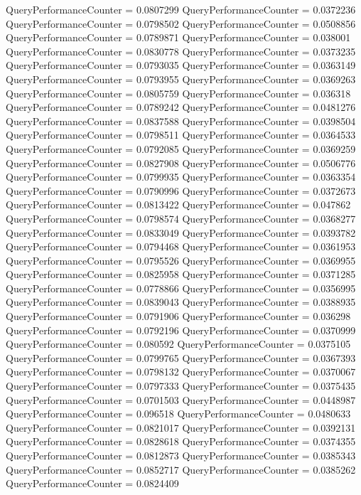 \documentclass[9pt]{article}
\theoremstyle{plain}
\theoremstyle{definition}
\theoremstyle{remark}
\numberwithin{equation}{section}
\begin{document}
QueryPerformanceCounter  =  0.0807299
QueryPerformanceCounter  =  0.0372236
QueryPerformanceCounter  =  0.0798502
QueryPerformanceCounter  =  0.0508856
QueryPerformanceCounter  =  0.0789871
QueryPerformanceCounter  =  0.038001
QueryPerformanceCounter  =  0.0830778
QueryPerformanceCounter  =  0.0373235
QueryPerformanceCounter  =  0.0793035
QueryPerformanceCounter  =  0.0363149
QueryPerformanceCounter  =  0.0793955
QueryPerformanceCounter  =  0.0369263
QueryPerformanceCounter  =  0.0805759
QueryPerformanceCounter  =  0.036318
QueryPerformanceCounter  =  0.0789242
QueryPerformanceCounter  =  0.0481276
QueryPerformanceCounter  =  0.0837588
QueryPerformanceCounter  =  0.0398504
QueryPerformanceCounter  =  0.0798511
QueryPerformanceCounter  =  0.0364533
QueryPerformanceCounter  =  0.0792085
QueryPerformanceCounter  =  0.0369259
QueryPerformanceCounter  =  0.0827908
QueryPerformanceCounter  =  0.0506776
QueryPerformanceCounter  =  0.0799935
QueryPerformanceCounter  =  0.0363354
QueryPerformanceCounter  =  0.0790996
QueryPerformanceCounter  =  0.0372673
QueryPerformanceCounter  =  0.0813422
QueryPerformanceCounter  =  0.047862
QueryPerformanceCounter  =  0.0798574
QueryPerformanceCounter  =  0.0368277
QueryPerformanceCounter  =  0.0833049
QueryPerformanceCounter  =  0.0393782
QueryPerformanceCounter  =  0.0794468
QueryPerformanceCounter  =  0.0361953
QueryPerformanceCounter  =  0.0795526
QueryPerformanceCounter  =  0.0369955
QueryPerformanceCounter  =  0.0825958
QueryPerformanceCounter  =  0.0371285
QueryPerformanceCounter  =  0.0778866
QueryPerformanceCounter  =  0.0356995
QueryPerformanceCounter  =  0.0839043
QueryPerformanceCounter  =  0.0388935
QueryPerformanceCounter  =  0.0791906
QueryPerformanceCounter  =  0.036298
QueryPerformanceCounter  =  0.0792196
QueryPerformanceCounter  =  0.0370999
QueryPerformanceCounter  =  0.080592
QueryPerformanceCounter  =  0.0375105
QueryPerformanceCounter  =  0.0799765
QueryPerformanceCounter  =  0.0367393
QueryPerformanceCounter  =  0.0798132
QueryPerformanceCounter  =  0.0370067
QueryPerformanceCounter  =  0.0797333
QueryPerformanceCounter  =  0.0375435
QueryPerformanceCounter  =  0.0701503
QueryPerformanceCounter  =  0.0448987
QueryPerformanceCounter  =  0.096518
QueryPerformanceCounter  =  0.0480633
QueryPerformanceCounter  =  0.0821017
QueryPerformanceCounter  =  0.0392131
QueryPerformanceCounter  =  0.0828618
QueryPerformanceCounter  =  0.0374355
QueryPerformanceCounter  =  0.0812873
QueryPerformanceCounter  =  0.0385343
QueryPerformanceCounter  =  0.0852717
QueryPerformanceCounter  =  0.0385262
QueryPerformanceCounter  =  0.0824409
\end{document}
